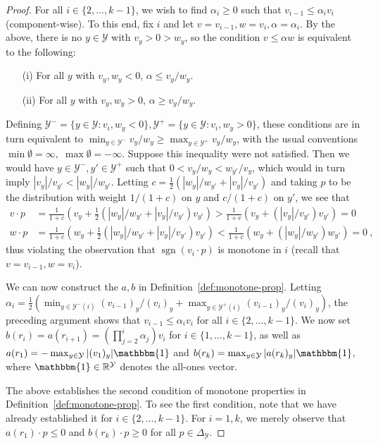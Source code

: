 \documentclass[anon,12pt]{colt2019}
\newcommand{\reals}{\mathbb{R}}
\newcommand{\simplex}{\Delta_\Y}
\newcommand{\Y}{\mathcal{Y}}
\newcommand{\ones}{\mathbbm{1}}
\DeclareMathOperator*{\sgn}{sgn}
\begin{document}
\begin{proof}
  For all $i\in\{2,\ldots,k-1\}$, we wish to find $\alpha_i \geq 0$ such that $v_{i-1} \leq \alpha_i v_i$ (component-wise).
  To this end, fix $i$ and let $v = v_{i-1}, w = v_{i}, \alpha=\alpha_i$.
  By the above, there is no $y\in\Y$ with $v_y > 0 > w_y$, so the condition $v \leq \alpha w$ is equivalent to the following:
  \begin{enumerate}
  \item[(i)] For all $y$ with $v_y,w_y < 0$, $\alpha \leq v_y/w_y$.
  \item[(ii)] For all $y$ with $v_y,w_y > 0$, $\alpha \geq v_y/w_y$.
  \end{enumerate}
  Defining $\Y^- = \{y\in\Y: v_i,w_y < 0\}, \Y^+ = \{y\in\Y: v_i,w_y > 0\}$, these conditions are in turn equivalent to $\min_{y\in\Y^-} v_y/w_y \geq \max_{y\in\Y^+} v_y/w_y$, with the usual conventions $\min \emptyset = \infty,\; \max \emptyset = -\infty$.
  Suppose this inequality were not satisfied.
  Then we would have $y \in \Y^-,y'\in\Y^+$ such that $0 < v_y/w_y < w_{y'}/v_y$, which would in turn imply $|v_y|/v_{y'} < |w_y| / w_{y'}$.
  Letting $c = \tfrac 1 2 \left(|w_y| / w_{y'} + |v_y|/v_{y'}\right)$ and taking $p$ to be the distribution with weight $1/(1+c)$ on $y$ and $c/(1+c)$ on $y'$, we see that
  \begin{align*}
    v \cdot p &= \frac 1 {1+c} \left(v_y + \tfrac 1 2 (|w_y| / w_{y'} + |v_y|/v_{y'})v_{y'}\right) > \frac 1 {1+c} \left(v_y + (|v_y|/v_{y'})v_{y'}\right) = 0
    \\
    w \cdot p &= \frac 1 {1+c} \left(w_y + \tfrac 1 2 (|w_y| / w_{y'} + |v_y|/v_{y'})v_{y'}\right) < \frac 1 {1+c} \left(w_y + (|w_y|/w_{y'})w_{y'}\right) = 0~,
  \end{align*}
  thus violating the observation that $\sgn(v_i\cdot p)$ is monotone in $i$ (recall that $v = v_{i-1}, w = v_{i}$).

  We can now construct the $a,b$ in Definition~\ref{def:monotone-prop}.
  Letting $\alpha_i = \tfrac 1 2 \left(\min_{y\in\Y^-(i)} (v_{i-1})_y/(v_{i})_y + \max_{y\in\Y^+(i)} (v_{i-1})_y/(v_{i})_y\right)$, the preceding argument shows that $v_{i-1} \leq \alpha_i v_{i}$ for all $i \in \{2,\ldots,k-1\}$.
  We now set $b(r_i) = a(r_{i+1}) = (\prod_{j=2}^i \alpha_j) v_i$ for $i\in\{1,\ldots,k-1\}$, as well as $a(r_1) = -\max_{y\in\Y} |(v_1)_y|\ones$ and $b(r_k) = \max_{y\in\Y} |a(r_k)_y|\ones$, where $\ones\in\reals^\Y$ denotes the all-ones vector.

  The above establishes the second condition of monotone properties in Definition~\ref{def:monotone-prop}.
  To see the first condition, note that we have already established it for $i\in\{2,\ldots,k-1\}$.
  For $i=1,k$, we merely observe that $a(r_1) \cdot p \leq 0$ and $b(r_k) \cdot p \geq 0$ for all $p\in\simplex$.
\end{proof}
\end{document}
